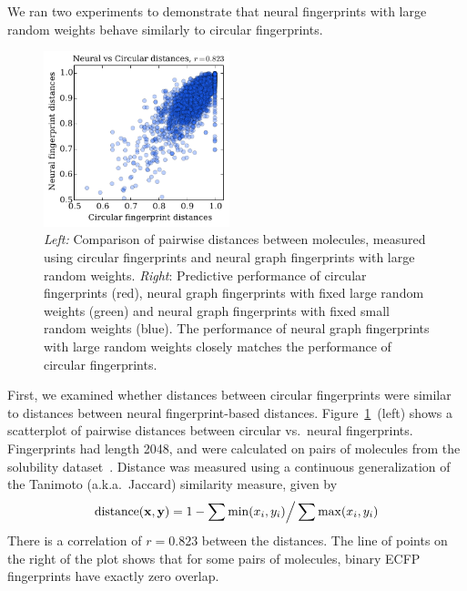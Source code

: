 \documentclass{article}
\newcommand{\citet}{\cite}
\newcommand{\vx}{\mathbf{x}}
\newcommand{\vy}{\mathbf{y}}
\begin{document}
We ran two experiments to demonstrate that neural fingerprints with large random weights behave similarly to circular fingerprints.
\begin{figure}[h]
\includegraphics[width=0.48\textwidth]{fig_2.pdf}
\caption{\emph{Left:} Comparison of pairwise distances between molecules, measured using circular fingerprints and neural graph fingerprints with large random weights.
\emph{Right}: Predictive performance of circular fingerprints (red), neural graph fingerprints with fixed large random weights (green) and neural graph fingerprints with fixed small random weights (blue).
The performance of neural graph fingerprints with large random weights closely matches the performance of circular fingerprints.}
\label{fig:fingerprint similarity}
\end{figure}
%
First, we examined whether distances between circular fingerprints were similar to distances between neural fingerprint-based distances.
Figure~\ref{fig:fingerprint similarity}~(left) shows a scatterplot of pairwise distances between circular vs.\ neural fingerprints.
Fingerprints had length 2048, and were calculated on pairs of molecules from the solubility dataset~\citet{delaney_data_2004}.
Distance was measured using a continuous generalization of the Tanimoto (a.k.a.\ Jaccard) similarity measure, given by
\begin{equation}
\textnormal{distance}(\vx, \vy) = 1 - \sum \min(x_i, y_i) \Big/ \sum \max(x_i, y_i)
\end{equation}
There is a correlation of $r = 0.823$ between the distances.
The line of points on the right of the plot shows that for some pairs of molecules, binary ECFP fingerprints have exactly zero overlap.
\end{document}
